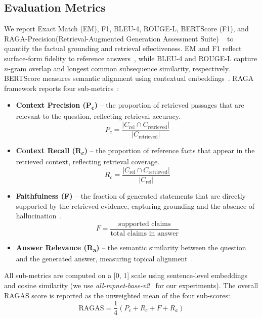 \documentclass{ieeeaccess}
\begin{document}
\subsection{Evaluation Metrics}
We report Exact Match (EM), F1, BLEU-4, ROUGE-L, BERTScore (F1), and RAGA-Precision(Retrieval-Augmented Generation Assessment Suite) ~\cite{ragas2023framework} to quantify the factual grounding and retrieval effectiveness. EM and F1 reflect surface-form fidelity to reference answers~\cite{rajpurkar2016squad}, while BLEU-4 and ROUGE-L capture $n$-gram overlap and longest common subsequence similarity, respectively. 
BERTScore measures semantic alignment using contextual embeddings~\cite{zhang2020bertscore}. RAGA framework reports four sub-metrics~\cite{ragas2023framework}:

\begin{itemize}
  \item \textbf{Context Precision (P\textsubscript{c})} – the proportion of retrieved passages that are relevant to the question, reflecting retrieval accuracy.
  \[
  P_c = \frac{|C_{\text{rel}} \cap C_{\text{retrieved}}|}{|C_{\text{retrieved}}|}
  \]

  \item \textbf{Context Recall (R\textsubscript{c})} – the proportion of reference facts that appear in the retrieved context, reflecting retrieval coverage.
  \[
  R_c = \frac{|C_{\text{rel}} \cap C_{\text{retrieved}}|}{|C_{\text{rel}}|}
  \]

  \item \textbf{Faithfulness (F)} – the fraction of generated statements that are directly supported by the retrieved evidence, capturing grounding and the absence of hallucination~\cite{shi2023retrievalhallucination}.
  \[
  F = \frac{\text{supported claims}}{\text{total claims in answer}}
  \]

  \item \textbf{Answer Relevance (R\textsubscript{a})} – the semantic similarity between the question and the generated answer, measuring topical alignment~\cite{reimers2019sentencebert}.
\end{itemize}

All sub-metrics are computed on a [0, 1] scale using sentence-level embeddings and cosine similarity (we use \textit{all-mpnet-base-v2}~\cite{reimers2021mpnet} for our experiments). 
The overall RAGAS score is reported as the unweighted mean of the four sub-scores:
\[
\text{RAGAS} = \frac{1}{4}(P_c + R_c + F + R_a)
\]
\end{document}
